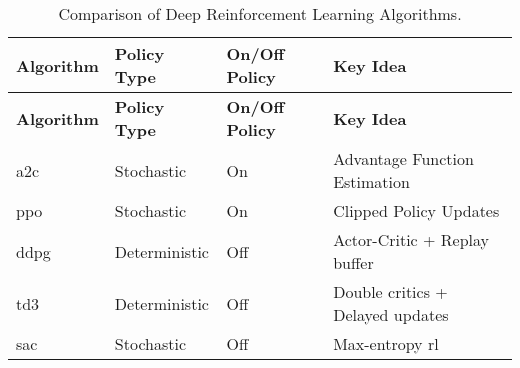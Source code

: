 \begin{longtable}{|l|l|l|l|}
    \caption{Comparison of Deep Reinforcement Learning Algorithms.}
    \label{tab:drl_algorithms_comparison}
    \\ 
    \hline
    \textbf{Algorithm} & \textbf{Policy Type} & \textbf{On/Off Policy} & \textbf{Key Idea} \\ \midrule
    \endfirsthead

    \hline
    \textbf{Algorithm} & \textbf{Policy Type} & \textbf{On/Off Policy} & \textbf{Key Idea} \\ \midrule
    \endhead

    \endfoot

    \acrshort{a2c} & Stochastic & On & Advantage Function Estimation \\ \hline
    \acrshort{ppo} & Stochastic & On & Clipped Policy Updates \\ \hline
    \acrshort{ddpg} & Deterministic & Off & Actor-Critic + Replay buffer \\ \hline
    \acrshort{td3} & Deterministic & Off & Double critics + Delayed updates \\ \hline
    \acrshort{sac} & Stochastic & Off & Max-entropy \acrshort{rl} \\ \hline
\end{longtable}